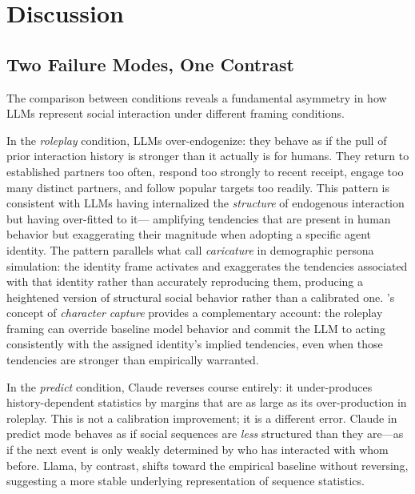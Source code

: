 \documentclass[11pt]{article}
\begin{document}
\section{Discussion}
\label{sec:discussion}

\subsection{Two Failure Modes, One Contrast}

The comparison between conditions reveals a fundamental asymmetry in how
LLMs represent social interaction under different framing conditions.

In the \emph{roleplay} condition, LLMs over-endogenize: they behave as if
the pull of prior interaction history is stronger than it actually is for
humans. They return to established partners too often, respond too strongly
to recent receipt, engage too many distinct partners, and follow popular
targets too readily. This pattern is consistent with LLMs having internalized
the \emph{structure} of endogenous interaction but having over-fitted to it---
amplifying tendencies that are present in human behavior but exaggerating
their magnitude when adopting a specific agent identity. The pattern
parallels what \citet{cheng2023compost} call \emph{caricature} in
demographic persona simulation: the identity frame activates and exaggerates
the tendencies associated with that identity rather than accurately reproducing
them, producing a heightened version of structural social behavior rather than
a calibrated one. \citet{shanahan2023role}'s concept of \emph{character
capture} provides a complementary account: the roleplay framing can override
baseline model behavior and commit the LLM to acting consistently with the
assigned identity's implied tendencies, even when those tendencies are stronger
than empirically warranted.

In the \emph{predict} condition, Claude reverses course entirely:
it under-produces history-dependent statistics by margins that are as large
as its over-production in roleplay. This is not a calibration improvement; it
is a different error. Claude in predict mode behaves as if social sequences are
\emph{less} structured than they are---as if the next event is only weakly
determined by who has interacted with whom before. Llama, by contrast, shifts
toward the empirical baseline without reversing, suggesting a more stable
underlying representation of sequence statistics.
\end{document}
